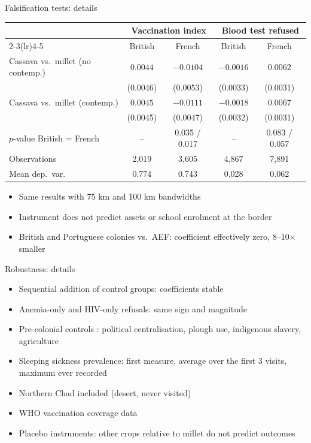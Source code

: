 \documentclass[aspectratio=1610]{beamer}
\newcommand{\returnbutton}[1]{\par\vfill\hfill\hyperlink{#1}{\beamerreturnbutton{Back}}}
\begin{document}
\begin{frame}[label=bk-falsification]{Falsification tests: details}
  \centering
  \footnotesize
  \begin{tabular}{lcccc}
    \toprule
    & \multicolumn{2}{c}{Vaccination index} & \multicolumn{2}{c}{Blood test refused} \\
    \cmidrule(lr){2-3}\cmidrule(lr){4-5}
    & British & French & British & French \\
    \midrule
    Cassava vs.\ millet (no contemp.) & $0.0044$ & $-0.0104$ & $-0.0016$ & $0.0062$ \\
                                      & (0.0046) & (0.0053)  & (0.0033)  & (0.0031) \\
    Cassava vs.\ millet (contemp.)    & $0.0045$ & $-0.0111$ & $-0.0018$ & $0.0067$ \\
                                      & (0.0045) & (0.0047)  & (0.0032)  & (0.0031) \\
    $p$-value British = French        & -- & 0.035 / 0.017 & -- & 0.083 / 0.057 \\
    Observations & 2,019 & 3,605 & 4,867 & 7,891 \\
    Mean dep.\ var. & 0.774 & 0.743 & 0.028 & 0.062 \\
    \bottomrule
  \end{tabular}

  \vspace{0.5em}
  \raggedright\small
  \begin{itemize}
    \item Same results with 75 km and 100 km bandwidths
    \item Instrument does not predict assets or school enrolment at the border
    \item British and Portuguese colonies vs.\ AEF: coefficient effectively zero, 8--10$\times$ smaller
  \end{itemize}
  \returnbutton{main-falsif}
\end{frame}

\begin{frame}[label=bk-robust]{Robustness: details}
  \begin{itemize}
    \item Sequential addition of control groups: coefficients stable
    \item Anemia-only and HIV-only refusals: same sign and magnitude
    \item Pre-colonial controls \citep[Murdock's Ethnographic Atlas;][]{nunn_wantchekon_2011}:
      political centralisation, plough use, indigenous slavery, agriculture
    \item Sleeping sickness prevalence: first measure, average over the first 3 visits, maximum ever recorded
    \item Northern Chad included (desert, never visited)
    \item WHO vaccination coverage data
    \item Placebo instruments: other crops relative to millet do not predict outcomes
  \end{itemize}
  \returnbutton{main-robust}
\end{frame}
\end{document}
